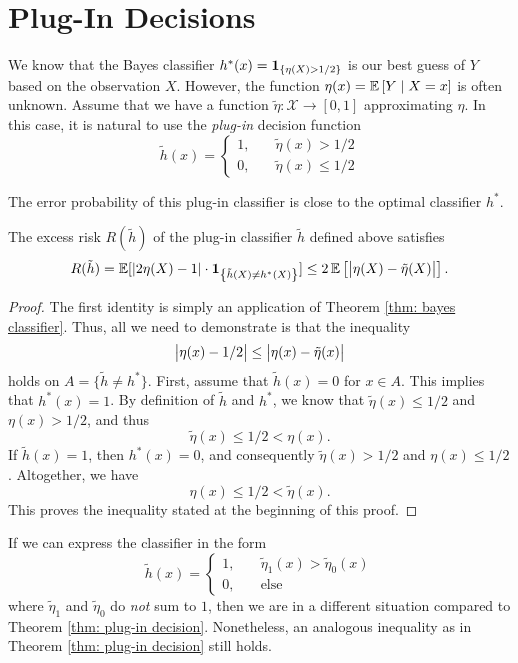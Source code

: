 \section{Plug-In Decisions}
\label{subsec: plug-in decisions}

We know that the Bayes classifier $h^*(x) = \mathbf{1}_{\left\{\eta(X) > 1/2\right\}}$ is our best guess of $Y$ based on the observation $X$. However, the function $\eta(x) = \mathbb{E}\left[Y \mathrel{|} X=x\right]$ is often unknown. Assume that we have a function $\tilde\eta \colon \mathcal{X} \to [0, 1]$ approximating $\eta$. In this case, it is natural to use the \emph{plug-in} decision function
\[
    \tilde h(x) = \begin{cases}
        1, \quad &\tilde\eta(x) > 1/2 \\
        0, \quad &\tilde\eta(x) \leq 1/2
    \end{cases}
\]

The error probability of this plug-in classifier is close to the optimal classifier $h^*$.

\begin{theorem}
\label{thm: plug-in decision}
The excess risk $R(\tilde h)$ of the plug-in classifier $\tilde h$ defined above satisfies
\[
    R(\tilde h) = \mathbb{E}[\abs{2 \eta(X) - 1} \cdot \mathbf{1}_{\left\{\tilde h(X) \neq h^*(X)\right\}}] \leq 2 \, \mathbb{E}\left[\big\lvert \eta(X) - \tilde\eta(X) \big\rvert\right].
\]
\end{theorem}

\begin{proof}
The first identity is simply an application of Theorem \ref{thm: bayes classifier}. Thus, all we need to demonstrate is that the inequality
\[
    \big\lvert \eta(x) - 1/2 \big\rvert \leq \big\lvert \eta(x) - \tilde\eta(x) \big\rvert
\]
holds on $A = \{\tilde h \neq h^*\}$. First, assume that $\tilde h(x) = 0$ for $x \in A$. This implies that $h^*(x) = 1$. By definition of $\tilde h$ and $h^*$, we know that $\tilde\eta(x) \leq 1/2$ and $\eta(x) > 1/2$, and thus
\[
    \tilde\eta(x) \leq 1/2 < \eta(x).
\]
If $\tilde h(x) = 1$, then $h^*(x) = 0$, and consequently $\tilde\eta(x) > 1/2$ and $\eta(x) \leq 1/2$. Altogether, we have
\[
    \eta(x) \leq 1/2 < \tilde\eta(x).
\]
This proves the inequality stated at the beginning of this proof.
\end{proof}

If we can express the classifier in the form
\[
    \tilde h(x) = \begin{cases}
        1, \quad &\tilde\eta_1(x) > \tilde\eta_0(x) \\
        0, \quad &\text{else}
    \end{cases}
\]
where $\tilde\eta_1$ and $\tilde\eta_0$ do \emph{not} sum to $1$, then we are in a different situation compared to Theorem \ref{thm: plug-in decision}. Nonetheless, an analogous inequality as in Theorem \ref{thm: plug-in decision} still holds.

